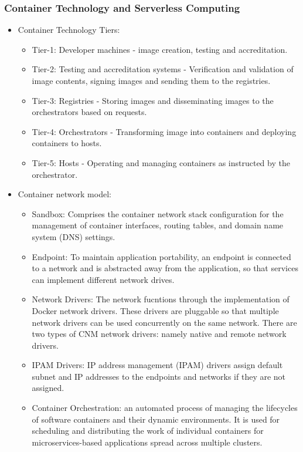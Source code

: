 \subsubsection{Container Technology and Serverless Computing}
\begin{itemize}
    \item Container Technology Tiers:
    \begin{itemize}
        \item Tier-1: Developer machines - image creation, testing and accreditation.
        \item Tier-2: Testing and accreditation systems - Verification and validation of image contents, signing images and sending them to the registries.
        \item Tier-3: Registries - Storing images and disseminating images to the orchestrators based on requests.
        \item Tier-4: Orchestrators - Transforming image into containers and deploying containers to hosts.
        \item Tier-5: Hosts - Operating and managing containers as instructed by the orchestrator.
    \end{itemize}
    \item Container network model:
    \begin{itemize}
        \item Sandbox: Comprises the container network stack configuration for the management of container interfaces, routing tables, and domain name system (DNS) settings.
        \item Endpoint: To maintain application portability, an endpoint is connected to a network and is abstracted away from the application, so that services can implement different network drives.
        \item Network Drivers: The network fucntions through the implementation of Docker network drivers. These drivers are pluggable so that multiple network drivers can be used concurrently on the same network. There are two types of CNM network drivers: namely native and remote network drivers.
        \item IPAM Drivers: IP address management (IPAM) drivers assign default subnet and IP addresses to the endpoints and networks if they are not assigned.
        \item Container Orchestration: an automated process of managing the lifecycles of software containers and their dynamic environments. It is used for scheduling and distributing the work of individual containers for microservices-based applications spread across multiple clusters.

\end{itemize}
\end{itemize}
